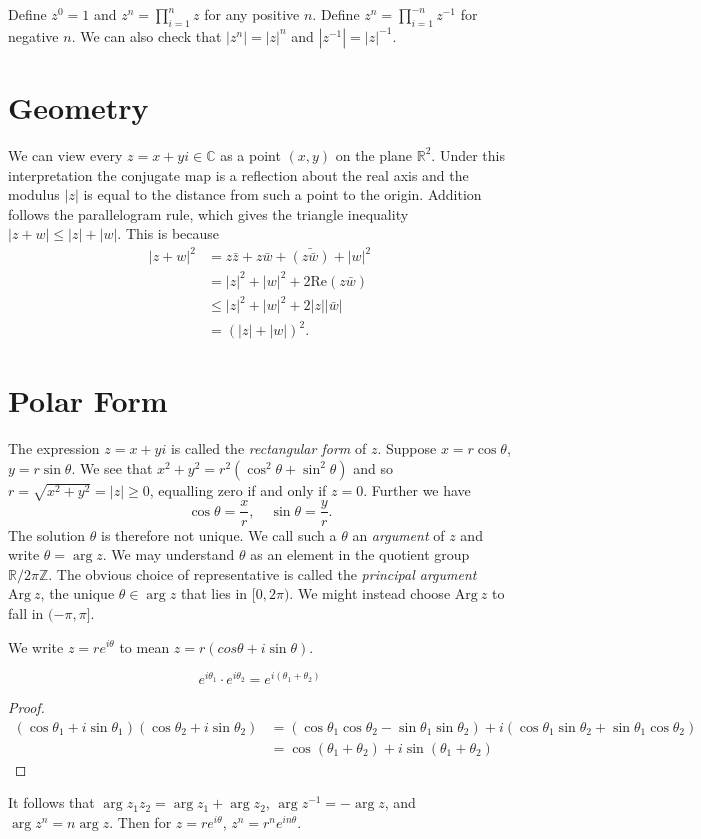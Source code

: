 Define $z^0 = 1$ and $z^n = \prod_{i=1}^n z$ for any positive $n$.
Define $z^n = \prod_{i=1}^{-n} z^{-1}$ for negative $n$. We can also
check that $|z^n| = |z|^n$ and $|z^{-1}| = |z|^{-1}$.

\section{Geometry}
We can view every $z = x + yi \in \mathbb{C}$ as a point $(x,y)$ on the plane
$\mathbb{R}^2$. Under this interpretation the conjugate map is a reflection
about the real axis and the modulus $|z|$ is equal to the distance from such a
point to the origin. Addition follows the parallelogram rule, which gives the
triangle inequality $|z + w| \leq |z| + |w|$. This is because
\begin{align*}
      |z + w|^2
&=    z \bar{z} + z\bar{w} + \bar{(z\bar{w})} + |w|^2 \\
&=    |z|^2 + |w|^2 + 2 \mathrm{Re}(z\bar{w}) \\
&\leq |z|^2 + |w|^2 + 2|z||\bar{w}| \\
&=    (|z| + |w|)^2.
\end{align*}

\section{Polar Form}

The expression $z = x + yi$ is called the \emph{rectangular form}
of $z$. Suppose $x = r \cos \theta$, $y = r \sin \theta$. We see that
$x^2 + y^2 = r^2 (\cos^2 \theta + \sin^2 \theta)$ and so
$r = \sqrt{x^2 + y^2} = |z| \geq 0$, equalling zero if and only if $z = 0$.
Further we have
$$
\cos \theta = \frac{x}{r}, \quad
\sin \theta = \frac{y}{r}.
$$
The solution $\theta$ is therefore not unique. We call such a $\theta$ an
\emph{argument} of $z$ and write $\theta = \arg z$. We may understand
$\theta$ as an element in the quotient group $\mathbb{R} / 2 \pi \mathbb{Z}$.
The obvious choice of representative is called the \emph{principal argument}
$\mathrm{Arg}~z$, the unique $\theta \in \arg z$ that lies in $[0, 2\pi)$.
We might instead choose $\mathrm{Arg}~z$ to fall in $(-\pi, \pi]$.

We write $z = r e^{i\theta}$ to mean $z = r (cos \theta + i \sin \theta)$.

\begin{theorem}
  $$
  e^{i\theta_1} \cdot e^{i \theta_2} = e^{i(\theta_1 + \theta_2)}
  $$
\end{theorem}
\begin{proof}
  \begin{align*}
     (\cos \theta_1 + i \sin \theta_1)(\cos \theta_2 + i \sin \theta_2)
  &= (\cos \theta_1 \cos \theta_2 - \sin \theta_1 \sin \theta_2)
   + i(\cos \theta_1 \sin \theta_2 + \sin \theta_1 \cos \theta_2) \\
  &= \cos (\theta_1 + \theta_2) + i \sin (\theta_1 + \theta_2)
  \end{align*}
\end{proof}
It follows that $\arg z_1 z_2 = \arg z_1 + \arg z_2$,
$\arg z^{-1} = -\arg z$, and $\arg z^n = n \arg z$. Then
for $z = r e^{i\theta}$, $z^n = r^n e^{i n \theta}$.

